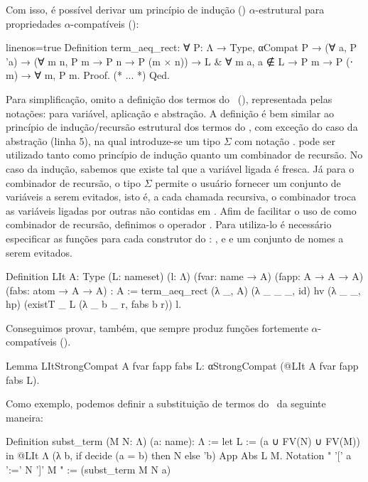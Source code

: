 Com isso, é possível derivar um princípio de indução () $\alpha$-estrutural para propriedades $\alpha$-compatíveis ():
\begin{coqcode*}{linenos=true}
Definition term_aeq_rect:
  ∀ P: Λ → Type, αCompat P →
    (∀ a, P 'a) →
    (∀ m n, P m → P n → P (m × n)) →
    {L & ∀ m a, a ∉ L → P m → P (\a ⋅ m)} →
    ∀ m, P m.
Proof. (* ... *) Qed.
\end{coqcode*}
Para simplificação, omito a definição dos termos do \lcalc~(), representada pelas notações:  para variável,  aplicação e  abstração. A definição  é bem similar ao princípio de indução/recursão estrutural dos termos do \lcalc, com exceção do caso da abstração (linha 5), na qual introduze-se um tipo $\Sigma$ com notação .  pode ser utilizado tanto como princípio de indução quanto um combinador de recursão. No caso da indução, sabemos que existe  tal que a variável ligada é fresca. Já para o combinador de recursão, o tipo $\Sigma$ permite o usuário fornecer um conjunto de variáveis a serem evitados, isto é, a cada chamada recursiva, o combinador troca as variáveis ligadas por outras não contidas em . Afim de facilitar o uso de  como combinador de recursão, definimos o operador . Para utiliza-lo é necessário especificar as funções para cada construtor do \lcalc: ,  e  e um conjunto  de nomes a serem evitados.
\begin{coqcode}
Definition LIt {A: Type} (L: nameset) (l: Λ)
           (fvar: name → A) (fapp: A → A → A) (fabs: atom → A → A) : A :=
  term_aeq_rect (λ _, A) (λ _ _ _, id) hv (λ _ _, hp)
                (existT _ L (λ _ b _ r, fabs b r)) l.
\end{coqcode}
Conseguimos provar, também, que  sempre produz funções fortemente $\alpha$-compatíveis ().
\begin{coqcode}
Lemma LItStrongCompat {A} fvar fapp fabs L:
  αStrongCompat (@LIt A fvar fapp fabs L).
\end{coqcode}
Como exemplo, podemos definir a substituição de termos do \lcalc~da seguinte maneira:
\begin{coqcode}
Definition subst_term (M N: Λ) (a: name): Λ :=
  let L := ({a} ∪ FV(N) ∪ FV(M)) in
  @LIt Λ (λ b, if decide (a = b) then N else 'b) App Abs L M.
Notation " '[' a ':=' N ']' M " := (subst_term M N a)
\end{coqcode}
